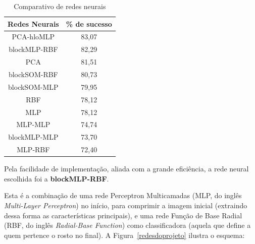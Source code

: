 \documentclass[hidelinks,11pt,twocolumn]{article}
\begin{document}
\begin{table}[H]
\centering

\begin{tabular}{|c|c|}
\hline
\textbf{Redes Neurais} 	& \textbf{\% de sucesso} \\ \hline
PCA-hlo{MLP} 				& 83,07 \\ \hline
blockMLP-RBF 				& 82,29 \\ \hline
PCA 								& 81,51 \\ \hline
blockSOM-RBF				& 80,73 \\ \hline
blockSOM-MLP				& 79,95 \\ \hline
RBF								& 78,12 \\ \hline
MLP								& 78,12 \\ \hline
MLP-MLP						& 74,74 \\ \hline
blockMLP-MLP				& 73,70 \\ \hline
MLP-RBF						& 72,40 \\ \hline
\end{tabular}
\caption{Comparativo de redes neurais \cite{oravec}}
\label{tab:redes}
\end{table}

Pela facilidade de implementação, aliada com a grande eficiência, a rede neural escolhida foi a \textbf{blockMLP-RBF}.

Esta é a combinação de uma rede Perceptron Multicamadas (MLP, do inglês \textit{Multi-Layer Perceptron}) no início, para comprimir a imagem inicial (extraindo dessa forma as características principais), e uma rede Função de Base Radial (RBF, do inglês \textit{Radial-Base Function}) como classificadora (aquela que define a quem pertence o rosto no final). A Figura~\ref{redesdoprojeto} ilustra o esquema:
\end{document}

